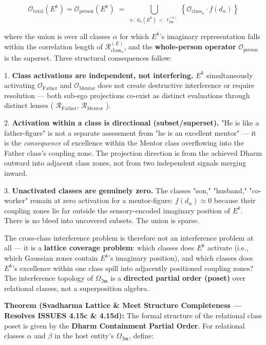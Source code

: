 \documentclass[11pt,a4paper]{article}
\theoremstyle{definition}
\theoremstyle{remark}
\begin{document}
\begin{equation}
\boxed{\mathcal{O}_{\text{total}}(E^k) = \mathcal{O}_{\text{person}}(E^k) \;=\; \bigcup_{\alpha \,:\, d_\alpha(E^k) \,<\, \ell_{\mathfrak{Im}}^{(\alpha)}} \left\{ \mathcal{O}_{\text{class}_\alpha} \cdot f\!\left(d_\alpha\right) \right\}}
\end{equation}


where the union is over all classes $\alpha$ for which $E^k$'s imaginary representation falls within the correlation length of $\mathcal{R}_{\text{class}_\alpha}^{(E)}$, and the \textbf{whole-person operator} $\mathcal{O}_{\text{person}}$ is the superset. Three structural consequences follow:

1. \textbf{Class activations are independent, not interfering.} $E^k$ simultaneously activating $\mathcal{O}_{\text{Father}}$ and $\mathcal{O}_{\text{Mentor}}$ does not create destructive interference or require resolution — both sub-ego projections co-exist as distinct evaluations through distinct lenses ( $\mathcal{R}_{\text{Father}}$, $\mathcal{R}_{\text{Mentor}}$ ).

2. \textbf{Activation within a class is directional (subset/superset).} "He is like a father-figure" is not a separate assessment from "he is an excellent mentor" — it is the \textit{consequence} of excellence within the Mentor class overflowing into the Father class's coupling zone. The projection direction is from the achieved Dharm outward into adjacent class zones, not from two independent signals merging inward.

3. \textbf{Unactivated classes are genuinely zero.} The classes "son," "husband," "co-worker" remain at zero activation for a mentor-figure: $f(d_\alpha) \approx 0$ because their coupling zones lie far outside the sensory-encoded imaginary position of $E^k$. There is no bleed into uncovered subsets. The union is sparse.

The cross-class interference problem is therefore not an interference problem at all — it is a \textbf{lattice coverage problem}: which classes does $E^k$ activate (i.e., which Gaussian zones contain $E^k$'s imaginary position), and which classes does $E^k$'s excellence within one class spill into adjacently positioned coupling zones? The interference topology of $\Omega_{\mathfrak{Im}}$ is a \textbf{directed partial order (poset)} over relational classes, not a superposition algebra.

\textbf{Theorem (Svadharma Lattice \& Meet Structure Completeness — Resolves ISSUES 4.15c \& 4.15d):} The formal structure of the relational class poset is given by the \textbf{Dharm Containment Partial Order}. For relational classes $\alpha$ and $\beta$ in the host entity's $\Omega_{\mathfrak{Im}}$, define:
\end{document}
